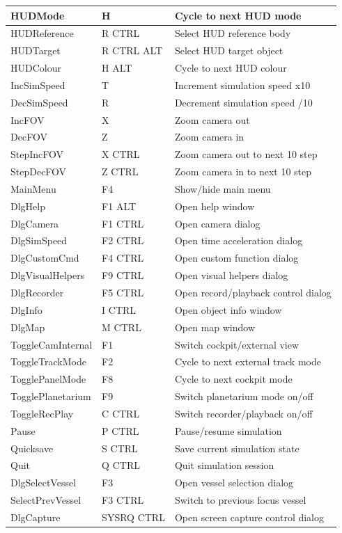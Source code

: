 \documentclass[Orbiter User Manual.tex]{subfiles}
\begin{document}
\begin{longtable}{ p{} p{} p{} }
	\hline
	HUDMode & H & Cycle to next HUD mode\\
	\hline
	HUDReference & R CTRL & Select HUD reference body\\
	\hline
	HUDTarget & R CTRL ALT & Select HUD target object\\
	\hline
	HUDColour & H ALT & Cycle to next HUD colour\\
	\hline
	IncSimSpeed & T & Increment simulation speed x10\\
	\hline
	DecSimSpeed & R & Decrement simulation speed /10\\
	\hline
	IncFOV & X & Zoom camera out\\
	\hline
	DecFOV & Z & Zoom camera in\\
	\hline
	StepIncFOV & X CTRL & Zoom camera out to next 10\deg{} step\\
	\hline
	StepDecFOV & Z CTRL & Zoom camera in to next 10\deg{} step\\
	\hline
	MainMenu & F4 & Show/hide main menu\\
	\hline
	DlgHelp & F1 ALT & Open help window\\
	\hline
	DlgCamera & F1 CTRL & Open camera dialog\\
	\hline
	DlgSimSpeed & F2 CTRL & Open time acceleration dialog\\
	\hline
	DlgCustomCmd & F4 CTRL & Open custom function dialog\\
	\hline
	DlgVisualHelpers & F9 CTRL & Open visual helpers dialog\\
	\hline
	DlgRecorder & F5 CTRL & Open record/playback control dialog\\
	\hline
	DlgInfo & I CTRL & Open object info window\\
	\hline
	DlgMap & M CTRL & Open map window\\
	\hline
	ToggleCamInternal & F1 & Switch cockpit/external view\\
	\hline
	ToggleTrackMode & F2 & Cycle to next external track mode\\
	\hline
	TogglePanelMode & F8 & Cycle to next cockpit mode\\
	\hline
	TogglePlanetarium & F9 & Switch planetarium mode on/off\\
	\hline
	ToggleRecPlay & C CTRL & Switch recorder/playback on/off\\
	\hline
	Pause & P CTRL & Pause/resume simulation\\
	\hline
	Quicksave & S CTRL & Save current simulation state\\
	\hline
	Quit & Q CTRL & Quit simulation session\\
	\hline
	DlgSelectVessel & F3 & Open vessel selection dialog\\
	\hline
	SelectPrevVessel & F3 CTRL & Switch to previous focus vessel\\
	\hline
	DlgCapture & SYSRQ CTRL & Open screen capture control dialog\\
	\hline
	\end{longtable}
	\normalsize
\end{document}
